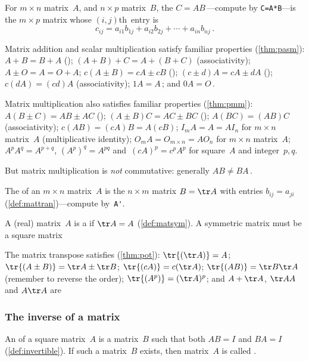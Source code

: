 \begin{itemize}
\begin{itemize}
\itemhi For \(m\times n\) matrix~\(A\), and \(n\times p\) matrix~\(B\), the  \(C=AB\)\,---compute by \verb|C=A*B|---is the \(m\times p\) matrix whose \((i,j)\)th~entry is
\begin{equation*}
c_{ij}=a_{i1}b_{1j}+a_{i2}b_{2j}+\cdots+a_{in}b_{nj}\,.
\end{equation*}

\end{itemize}

\itemme Matrix addition and scalar multiplication satisfy familiar properties (\cref{thm:pasm}): 
 \(A+B=B+A\) ();
 \((A+B)+C=A+(B+C)\) (associativity);
 \(A\pm O=A=O+A\);
 \(c(A\pm B)=cA\pm cB\) ();
 \((c\pm d)A=cA\pm dA\) ();
 \(c(dA)=(cd)A\) (associativity);
 \(1A=A\)\,; and 
 \(0A=O\)\,.
 
\itemme Matrix multiplication also satisfies familiar properties (\cref{thm:pmm}):
 \(A(B\pm C)=AB\pm AC\) ();
 \((A\pm B)C=AC\pm BC\) ();
 \(A(BC)=(AB)C\) (associativity);
 \(c(AB)=(cA)B=A(cB)\);
 \(I_mA=A=AI_n\) for \(m\times n\) matrix~\(A\) (multiplicative identity);
 \(O_mA=O_{m\times n}=AO_n\)  for \(m\times n\) matrix~\(A\);
 \(A^pA^q=A^{p+q}\), \((A^p)^q=A^{pq}\) and~\((cA)^p=c^pA^p\) for square~\(A\) and integer~\(p,q\).
 
But matrix multiplication is \emph{not} commutative: generally \(AB\neq BA\)\,.

\itemhi The  of an \(m\times n\) matrix~\(A\) is the \(n\times m\) matrix \(B=\tr A\) with entries \(b_{ij}=a_{ji}\) (\cref{def:mattran})---compute by~\verb|A'|.

A (real) matrix~\(A\) is a  if \(\tr A=A\) (\cref{def:matsym}).
A symmetric matrix must be a square matrix

\itemme The matrix transpose satisfies (\cref{thm:pot}):
\(\tr{(\tr A)}=A\);
\(\tr{(A\pm B)}=\tr A\pm \tr B\);
\(\tr{(cA)}=c(\tr A)\);
\(\tr{(AB)}=\tr B\tr A\) (remember to reverse the order);
\(\tr{(A^p)}=(\tr A)^p\);
and \(A+\tr A\),  \(\tr AA\) and \(A\tr A\) are 





\subsubsection{The inverse of a matrix}

\itemhi An  of a square matrix~\(A\) is a matrix~\(B\) such that both \(AB=I\) and \(BA=I\) (\cref{def:invertible}).
If such a matrix~\(B\) exists, then matrix~\(A\) is called .


\end{itemize}

